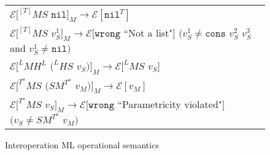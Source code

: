 \begin{figure}[p]
\begin{tabular}{l}
\vspace{5pt}

$\mathscr{E}[^{[T]}MS$ $\mathtt{nil}]_{M}\rightarrow\mathscr{E}[\mathtt{nil}^{T}]$ \\

\vspace{5pt}

$\mathscr{E}[^{[T]}MS$ $v_{S}^{1}]_{M}\rightarrow\mathscr{E}[\mathtt{wrong}$ ``Not a list"$]$ $(v_{S}^{1}\neq\mathtt{cons}$ $v_{S}^{2}$ $v_{S}^{3}$ and $v_{S}^{1}\neq\mathtt{nil})$ \\

\vspace{5pt}

$\mathscr{E}[^{L}MH^{L}$ $(^{L}HS$ $v_{S})]_{M}\rightarrow\mathscr{E}[^{L}MS$ $v_{S}]$ \\

\vspace{5pt}

$\mathscr{E}[^{T^{a}}MS$ $(SM^{T^{a}}$ $v_{M})]_{M}\rightarrow\mathscr{E}[v_{M}]$ \\

\vspace{5pt}

$\mathscr{E}[^{T^{a}}MS$ $v_{S}]_{M}\rightarrow\mathscr{E}[\mathtt{wrong}$ ``Parametricity violated"$]$ $(v_{S}\neq SM^{T^{a}}$ $v_{M})$
\end{tabular}
\caption{Interoperation ML operational semantics}
\label{imos}
\end{figure}